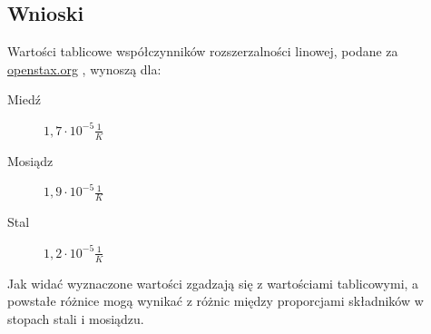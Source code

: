 \documentclass[a4paper, 11pt]{article}
\begin{document}
\subsection{Wnioski}\label{sub:wnioski} %
Wartości tablicowe współczynników rozszerzalności linowej, podane za \href{https://openstax.org/books/fizyka-dla-szk%C3%B3%C5%82-wy%C5%BCszych-tom-2/pages/1-3-rozszerzalnosc-cieplna}{openstax.org}
, wynoszą dla:
\begin{description}
	\item[Miedź] $ 1,7 \cdot 10^{-5} \frac{1}{K}$
	\item[Mosiądz] $ 1,9 \cdot 10^{-5} \frac{1}{K}$
	\item[Stal] $ 1,2 \cdot 10^{-5} \frac{1}{K}$
\end{description}
Jak widać wyznaczone wartości zgadzają się z wartościami tablicowymi, a powstałe różnice mogą wynikać z różnic między proporcjami składników w stopach stali i mosiądzu.
\end{document}
